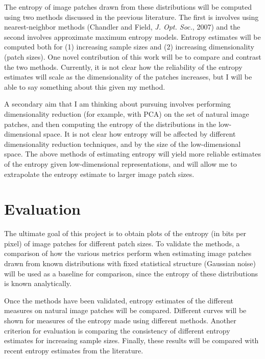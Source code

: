 \documentclass[10pt,twocolumn,letterpaper]{article}
\begin{document}
The entropy of image patches drawn from these distributions will be computed using two methods discussed in the previous literature. The first is involves using nearest-neighbor methods (Chandler and Field, \textit{J. Opt. Soc.}, 2007) and the second involves approximate maximum entropy models. Entropy estimates will be computed both for (1) increasing sample sizes and (2) increasing dimensionality (patch sizes). One novel contribution of this work will be to compare and contrast the two methods. Currently, it is not clear how the reliability of the entropy estimates will scale as the dimensionality of the patches increases, but I will be able to say something about this given my method.

A secondary aim that I am thinking about pursuing involves performing dimensionality reduction (for example, with PCA) on the set of natural image patches, and then computing the entropy of the distributions in the low-dimensional space. It is not clear how entropy will be affected by different dimensionality reduction techniques, and by the size of the low-dimensional space. The above methods of estimating entropy will yield more reliable estimates of the entropy given low-dimensional representations, and will allow me to extrapolate the entropy estimate to larger image patch sizes.
\section{Evaluation}
The ultimate goal of this project is to obtain plots of the entropy (in bits per pixel) of image patches for different patch sizes. To validate the methods, a comparison of how the various metrics perform when estimating image patches drawn from known distributions with fixed statistical structure (Gaussian noise) will be used as a baseline for comparison, since the entropy of these distributions is known analytically.

Once the methods have been validated, entropy estimates of the different measures on natural image patches will be compared. Different curves will be shown for measures of the entropy made using different methods. Another criterion for evaluation is comparing the consistency of different entropy estimates for increasing sample sizes. Finally, these results will be compared with recent entropy estimates from the literature.

\end{document}
